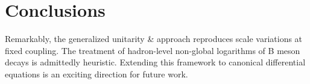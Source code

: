 \section{Conclusions}\label{sec:conclusions}

Remarkably, the generalized unitarity & approach reproduces scale
variations at fixed coupling. The treatment of hadron-level non-global
logarithms of B meson decays is admittedly heuristic. Extending this
framework to canonical differential equations is an exciting direction
for future work.

